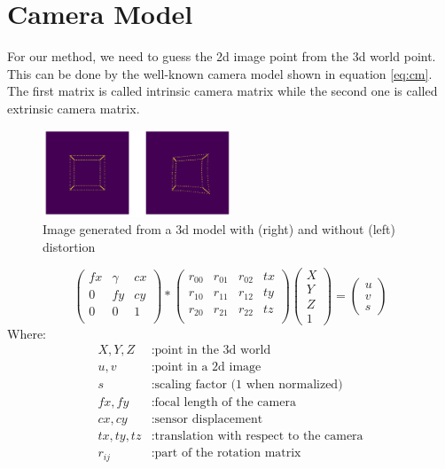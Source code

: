 \documentclass[conference,nofonttune]{IEEEtran}
\begin{document}
\section{Camera Model}
For our method, we need to guess the 2d image point from the 3d world point. This can be done by the well-known camera model \cite{rac} shown in equation \ref{eq:cm}. The first matrix is called intrinsic camera matrix while the second one is called extrinsic camera matrix.
\begin{figure}
  \includegraphics[width=0.5\textwidth]{img/model.png}
  \caption{Image generated from a 3d model with (right) and without (left) distortion}
  \label{fig:model}
\end{figure}
\scriptsize
\begin{equation}\label{eq:cm}
  \begin{pmatrix}fx & \gamma & cx \\
      0 & fy & cy \\
      0 & 0 & 1 \\
    \end{pmatrix}*
    \begin{pmatrix}
      r_{00} & r_{01} & r_{02} & tx \\
      r_{10} & r_{11} & r_{12} & ty \\
      r_{20} & r_{21} & r_{22} & tz \\
    \end{pmatrix}
    \begin{pmatrix}
      X \\
      Y \\
      Z \\
      1
    \end{pmatrix}=
    \begin{pmatrix}
      u \\
      v \\
      s
  \end{pmatrix}
\end{equation}
\normalsize
Where:
\begin{align*}
  X,Y,Z		&: \text{point in the 3d world}\\
  u,v	    	&: \text{point in a 2d image}\\
  s		&: \text{scaling factor (1 when normalized)}\\
  fx,fy   	&: \text{focal length of the camera}\\
  cx,cy   	&: \text{sensor displacement}\\
  tx,ty,tz	&: \text{translation with respect to the camera}\\
  r_{ij}	&: \text{part of the rotation matrix}
\end{align*}
\end{document}
